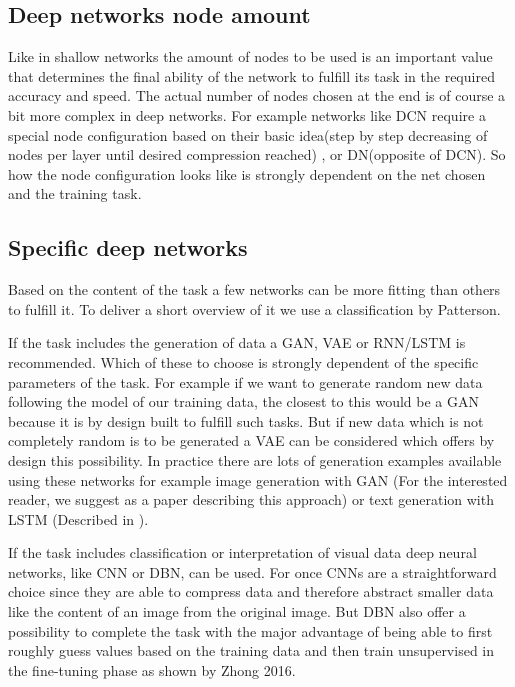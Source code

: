 \documentclass[conference]{IEEEtran}
\begin{document}
\subsection{Deep networks node amount}
Like in shallow networks the amount of nodes to be used is an important value that determines the final ability of the network to fulfill its task in the required accuracy and speed. The actual number of nodes chosen at the end is of course a bit more complex in deep networks. For example networks like DCN require a special node configuration based on their basic idea(step by step decreasing of nodes per layer until desired compression reached) , or DN(opposite of DCN). So how the node configuration looks like is strongly dependent on the net chosen and the training task.



\subsection{Specific deep networks}
Based on the content of the task a few networks can be more fitting than others to fulfill it. To deliver a short overview of it we use a classification by Patterson\cite{PattersonGibson17}.

If the task includes the generation of data a GAN, VAE or RNN/LSTM is recommended. Which of these to choose is strongly dependent of the specific parameters of the task. For example if we want to generate random new data following the model of our training data, the closest to this would be a GAN because it is by design built to fulfill such tasks. But if new data which is not completely random is to be generated a VAE can be considered which offers by design this possibility. In practice there are lots of generation examples available using these networks for example image generation with GAN\cite{junyanz2017} (For the interested reader, we suggest \cite{zhu2016generative} as a paper describing this approach) or text generation with LSTM\cite{gittesttensorflow} (Described in \cite{sutskever2011generating}).

If the task includes classification or interpretation of visual data deep neural networks, like CNN or DBN, can be used. For once CNNs are a straightforward choice since they are able to compress data and therefore abstract smaller data like the content of an image from the original image. But DBN also offer a possibility to complete the task with the major advantage of being able to first roughly guess values based on the training data and then train unsupervised in the fine-tuning phase as shown by Zhong 2016\cite{zhong2016diversified}.
\end{document}
